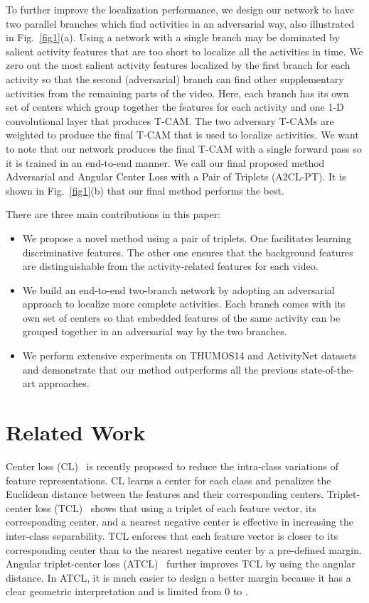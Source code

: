 \documentclass[runningheads]{llncs}
\newcommand{\tcam}{\mbox{T-CAM}}
\newcommand{\thumos}{\mbox{THUMOS14}}
\newcommand{\ourlossnamelong}{Adversarial and Angular Center Loss with a Pair of Triplets}
\newcommand{\ourlossname}{\mbox{A2CL-PT}}
\newcommand{\atclossname}{\mbox{ATCL}}
\newcommand{\tclossname}{\mbox{TCL}}
\newcommand{\clossname}{\mbox{CL}}
\begin{document}
To further improve the localization performance, we design our network to have two parallel branches which find activities in an adversarial way, also illustrated in Fig.~\ref{fig1}(a). Using a network with a single branch may be dominated by salient activity features that are too short to localize all the activities in time. We zero out the most salient activity features localized by the first branch for each activity so that the second (adversarial) branch can find other supplementary activities from the remaining parts of the video. Here, each branch has its own set of centers which group together the features for each activity and one 1-D convolutional layer that produces \tcam{}. The two adversary \tcam{}s are weighted to produce the final \tcam{} that is used to localize activities. We want to note that our network produces the final \tcam{} with a single forward pass so it is trained in an end-to-end manner. We call our final proposed method \ourlossnamelong{} (\ourlossname{}). It is shown in Fig.~\ref{fig1}(b) that our final method performs the best.

There are three main contributions in this paper:

\begin{itemize}[noitemsep,nolistsep]
   \item We propose a novel method using a pair of triplets. One facilitates learning discriminative features. The other one ensures that the background features are distinguishable from the activity-related features for each video.
   \item We build an end-to-end two-branch network by adopting an adversarial approach to localize more complete activities. Each branch comes with its own set of centers so that embedded features of the same activity can be grouped together in an adversarial way by the two branches.
   \item We perform extensive experiments on \thumos{} and ActivityNet datasets and demonstrate that our method outperforms all the previous state-of-the-art approaches.
\end{itemize}

\section{Related Work}

Center loss (\clossname{})~\cite{wen2016discriminative} is recently proposed to reduce the intra-class variations of feature representations. \clossname{} learns a center for each class and penalizes the Euclidean distance between the features and their corresponding centers. Triplet-center loss (\tclossname{})~\cite{he2018triplet} shows that using a triplet of each feature vector, its corresponding center, and a nearest negative center is effective in increasing the inter-class separability. \tclossname{} enforces that each feature vector is closer to its corresponding center than to the nearest negative center by a pre-defined margin. Angular triplet-center loss (\atclossname{})~\cite{li2019angular} further improves \tclossname{} by using the angular distance. In \atclossname{}, it is much easier to design a better margin because it has a clear geometric interpretation and is limited from 0 to .
\end{document}
